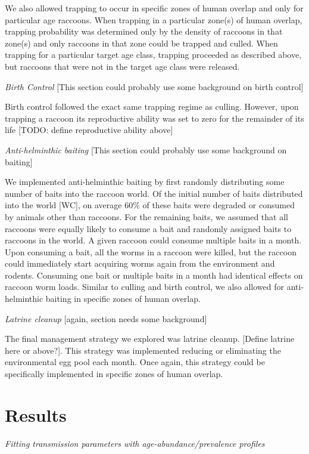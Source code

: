 \documentclass[11pt]{article}
\begin{document}
We also allowed trapping to occur in specific zones of human overlap and
only for particular age raccoons. When trapping in a particular zone(s)
of human overlap, trapping probability was determined only by the
density of raccoons in that zone(s) and only raccoons in that zone could
be trapped and culled. When trapping for a particular target age class,
trapping proceeded as described above, but raccoons that were not in the
target age class were released.

\emph{Birth Control} [This section could probably use some background
on birth control]

Birth control followed the exact same trapping regime as culling.
However, upon trapping a raccoon its reproductive ability was set to
zero for the remainder of its life {[}TODO: define reproductive ability
above{]}

\emph{Anti-helminthic baiting} [This section could probably use some
background on baiting]

We implemented anti-helminthic baiting by first randomly distributing
some number of baits into the raccoon world. Of the initial number of
baits distributed into the world {[}WC{]}, on average 60\% of these
baits were degraded or consumed by animals other than raccoons. For the
remaining baits, we assumed that all raccoons were equally likely to
consume a bait and randomly assigned baits to raccoons in the world. A
given raccoon could consume multiple baits in a month. Upon consuming a
bait, all the worms in a raccoon were killed, but the raccoon could
immediately start acquiring worms again from the environment and
rodents. Consuming one bait or multiple baits in a month had identical
effects on raccoon worm loads. Similar to culling and birth control, we
also allowed for anti-helminthic baiting in specific zones of human
overlap.

\emph{Latrine cleanup} [again, section needs some background]

The final management strategy we explored was latrine cleanup. {[}Define
latrine here or above?{]}. This strategy was implemented reducing or
eliminating the environmental egg pool each month. Once again, this
strategy could be specifically implemented in specific zones of human
overlap.

\section{Results}

\emph{Fitting transmission parameters with age-abundance/prevalence
profiles}
\end{document}
